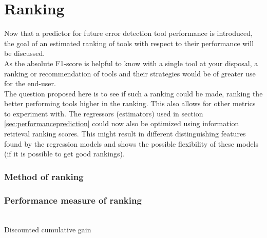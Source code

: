 
\section{Ranking}
\label{sec:toolranking}
% 

Now that a predictor for future error detection tool performance is introduced, the goal of an estimated ranking of tools with respect to their performance will be discussed.
~\\As the absolute F1-score is helpful to know with a single tool at your disposal, a ranking or recommendation of tools and their strategies would be of greater use for the end-user.
~\\The question proposed here is to see if such a ranking could be made, ranking the better performing tools higher in the ranking. This also allows for other metrics to experiment with. The regressors (estimators) used in section \ref{sec:performanceprediction} could now also be optimized using information retrieval ranking scores. This might result in different distinguishing features found by the regression models and shows the possible flexibility of these models (if it is possible to get good rankings).

\subsubsection{Method of ranking}

\subsubsection{Performance measure of ranking}

~\\Discounted cumulative gain 